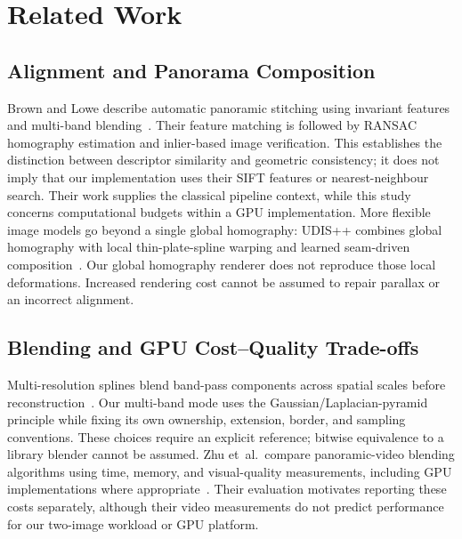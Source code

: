 \section{Related Work}
\label{sec:related}
\subsection{Alignment and Panorama Composition}
Brown and Lowe describe automatic panoramic stitching using invariant features
and multi-band blending~\cite{brown2007stitching}. Their feature matching is
followed by RANSAC homography estimation and inlier-based image verification.
This establishes the distinction between descriptor similarity and geometric
consistency; it does not imply that our implementation uses their SIFT features
or nearest-neighbour search. Their work supplies the classical pipeline context,
while this study concerns computational budgets within a GPU implementation.
More flexible image models go beyond a single global homography:
UDIS++ combines global homography with local thin-plate-spline warping and
learned seam-driven composition~\cite{nie2023udispp}. Our global homography
renderer does not reproduce those local deformations. Increased rendering cost
cannot be assumed to repair parallax or an incorrect alignment.

\subsection{Blending and GPU Cost--Quality Trade-offs}
Multi-resolution splines blend band-pass components across spatial scales before
reconstruction~\cite{burt1983spline}. Our multi-band mode uses the
Gaussian/Laplacian-pyramid principle while fixing its own ownership, extension,
border, and sampling conventions. These choices require an explicit reference;
bitwise equivalence to a library blender cannot be assumed. Zhu et~al.\
compare panoramic-video blending algorithms using time, memory, and visual-quality
measurements, including GPU implementations where
appropriate~\cite{zhu2018blending}. Their evaluation motivates reporting these
costs separately, although their video measurements do not predict performance
for our two-image workload or GPU platform.

